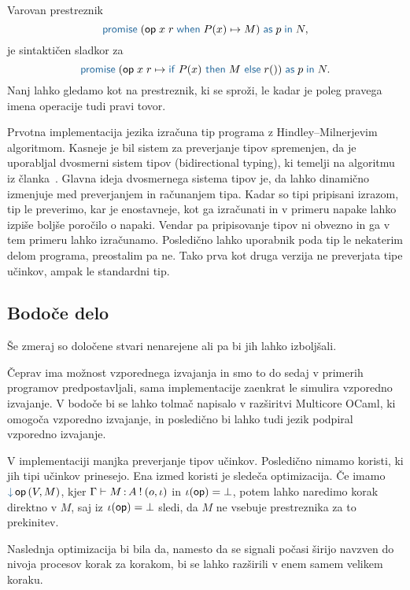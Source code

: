 
Varovan prestreznik $$\tmwithrecgu{op}{x}{r}{P(x)}{M}{p}{N},$$ je sintaktičen sladkor za $$\tmwithrec{op}{x}{r}{\tmif{P(x)}{M}{r()}}{p}{N}.$$
Nanj lahko gledamo kot na prestreznik, ki se sproži, le kadar je poleg pravega imena operacije tudi pravi tovor.

Prvotna implementacija jezika \aeff{} izračuna tip programa z Hindley–Milnerjevim algoritmom. 
Kasneje je bil sistem za preverjanje tipov spremenjen, da je uporabljal dvosmerni sistem tipov (bidirectional typing), ki temelji na algoritmu iz članka~\cite{bidirectional}.
Glavna ideja dvosmernega sistema tipov je, da lahko dinamično izmenjuje med preverjanjem in računanjem tipa.
Kadar so tipi pripisani izrazom, tip le preverimo, kar je enostavneje, kot ga izračunati in v primeru napake lahko izpiše boljše poročilo o napaki.
Vendar pa pripisovanje tipov ni obvezno in ga v tem primeru lahko izračunamo.
Posledično lahko uporabnik poda tip le nekaterim delom programa, preostalim pa ne.
Tako prva kot druga verzija ne preverjata tipe učinkov, ampak le standardni tip.

\subsection{Bodoče delo}

Še zmeraj so določene stvari nenarejene ali pa bi jih lahko izboljšali.

Čeprav ima \aeff{} možnost vzporednega izvajanja in smo to do sedaj v primerih programov predpostavljali, sama implementacije zaenkrat le simulira vzporedno izvajanje.
V bodoče bi se lahko tolmač napisalo v razširitvi Multicore OCaml, ki omogoča vzporedno izvajanje, in posledično bi lahko tudi jezik \aeff{} podpiral vzporedno izvajanje. 

V implementaciji manjka preverjanje tipov učinkov. Posledično nimamo koristi, ki jih tipi učinkov prinesejo.
Ena izmed koristi je sledeča optimizacija.
Če imamo $\tmopin{op}{V}{M}$, kjer $\Gamma \vdash M \mathinner{:} A \mathbin{!} (o, \iota)$ in $\iota(\mathsf{op}) = \bot$, potem lahko naredimo korak direktno v $M$, saj iz $\iota(\mathsf{op}) = \bot$ sledi, da $M$ ne vsebuje prestreznika za to prekinitev. 

Naslednja optimizacija bi bila da, namesto da se signali počasi širijo navzven do nivoja procesov korak za korakom, bi se lahko razširili v enem samem velikem koraku.

